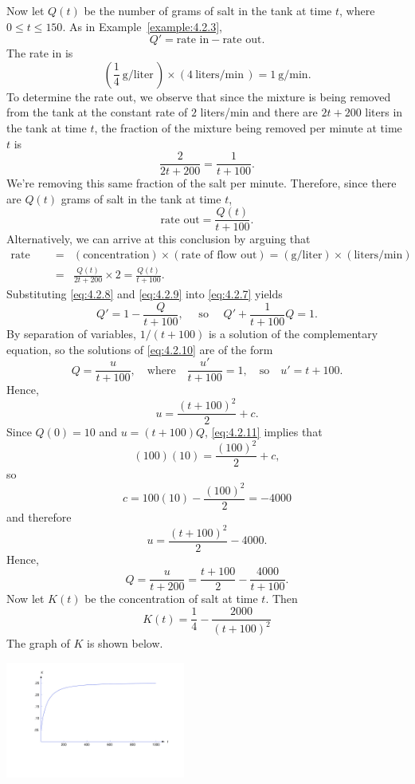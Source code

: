 \documentclass{ximera}
\begin{document}
\begin{example}
Now let $Q(t)$ be the number of grams of salt in the tank
at time $t$, where  $0 \leq t \leq 150$.  As in Example~\ref{example:4.2.3},
\begin{equation} \label{eq:4.2.7}
Q' = \mbox{rate in}-\mbox{rate out}.
\end{equation}
 The rate in is
\begin{equation} \label{eq:4.2.8}
\left(\frac{1}{4}\  \mbox{g/liter}\,\right) \times (4\
\mbox{liters/min}\,) = 1\  \mbox{g/min}.
\end{equation}
 To determine the rate out, we observe that since
the mixture is being removed from the tank at the constant
rate of $2$ liters/min and there are $2t+200$
liters in the tank at time $t$, the fraction of the mixture
being removed per minute at time $t$ is
$$
\frac{2}{2t+200} = \frac{1}{t+100}.
$$
We're removing this same fraction of the salt per
minute.  Therefore, since there are $Q(t)$ grams of salt in
the tank at time $t$,
\begin{equation} \label{eq:4.2.9}
\mbox{rate out} = \frac{Q(t)}{t+100}.
\end{equation}
Alternatively, we can arrive at this conclusion by arguing that
$$
\begin{array}{lcl}
\mbox{rate out} & = & (\mbox{concentration})\times(\mbox{rate of
flow out})
=(\mbox{g/liter})\times(\mbox{liters/min})\\
&=&\frac{Q(t)}{2t+200}\times
2=\frac{Q(t)}{t+100}.
\end{array}
$$
 Substituting \eqref{eq:4.2.8} and \eqref{eq:4.2.9} into \eqref{eq:4.2.7}
yields
\begin{equation} \label{eq:4.2.10}
Q'=1-\frac{Q}{t+100},\quad\text{ so }\quad
Q'+\frac{1}{t+100} Q=1.
\end{equation}
By separation of variables, $1/(t+100)$ is a solution of the
complementary equation, so the solutions of \eqref{eq:4.2.10}
are of the form
$$
Q=\frac{u}{t+100},\quad\mbox{where}\quad\frac{u'}{t+100}=1,\quad\mbox{so}\quad u'=t+100.
$$
Hence,
\begin{equation} \label{eq:4.2.11}
u = \frac{(t+100)^2}{2}+c.
\end{equation}
Since $Q(0)=10$  and $u=(t+100)Q$, \eqref{eq:4.2.11} implies that
$$
(100)(10) = \frac{(100)^2}{2}+c,
$$
so
$$
c=100(10)-\frac{(100)^2}{2} =-4000
$$
and therefore
$$
u = \frac{(t+100)^2}{2} -4000.
$$
 Hence,
 $$
Q = \frac{u}{t+200}= \frac{t+100}{2}-\frac{4000}{t+100}.
$$
Now let $K(t)$ be the concentration of salt at
time $t$.  Then
$$
K(t) = \frac{1}{4}-\frac{2000}{(t+100)^2}
$$
The graph of $K$ is shown below.
\begin{image}
  \includegraphics[height=1.5in]{fig040206.jpg} 
\end{image}

\end{example}
\end{document}
